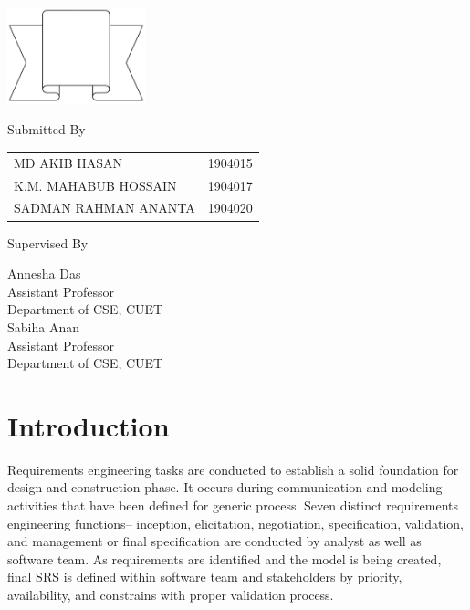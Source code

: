 \documentclass[a4paper,12pt]{report}
\begin{document}
\begin{titlepage}
	\vspace{2cm}
	\begin{center}
		\includegraphics[width=4cm, keepaspectratio]{remarks.png}
	\end{center}
	\parbox[l]{.5\linewidth}{\begin{center}
			Submitted By
		\end{center}
		\raggedright
		\begin{tabular}{ll}
			MD AKIB HASAN        & 1904015 \\[.1cm]
			K.M. MAHABUB HOSSAIN & 1904017 \\[.1cm]
			SADMAN RAHMAN ANANTA & 1904020 \\
		\end{tabular}
	}
	\parbox[r]{7.8cm}{\vspace{1.5cm}
	\begin{center}
		Supervised By
	\end{center}
	\raggedleft
	Annesha Das\\
	{\footnotesize
	Assistant Professor \\
	Department of CSE, CUET}\\[0.5cm]

	Sabiha Anan\\
	{\footnotesize
	Assistant Professor \\
	Department of CSE, CUET}

	}

	\vfill
\end{titlepage}


\onehalfspacing

\section*{Introduction}

Requirements engineering tasks are conducted to establish a solid foundation for design and construction phase. It occurs during communication and modeling activities that have been defined for generic process. Seven distinct requirements engineering functions-- inception, elicitation, negotiation, specification, validation, and management or final specification are conducted by analyst as well as software team. As requirements are identified and the model is being created, final SRS is defined within software team and stakeholders by priority, availability, and constrains with proper validation process.
\end{document}
